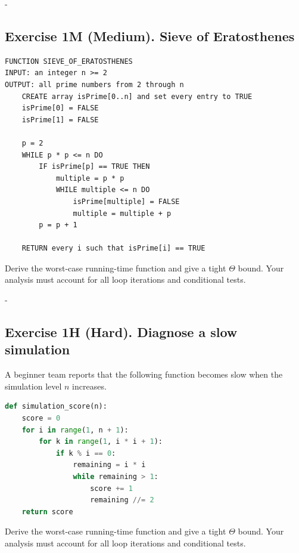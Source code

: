 \documentclass[11pt,a4paper]{article}
\makeatletter
\newcommand{\Needspace}[1]{\par\penalty-100\begingroup\setlength{\dimen@}{#1}\dimen@ii\pagegoal\advance\dimen@ii-\pagetotal\ifdim\dimen@>\dimen@ii\break\fi\endgroup}
\makeatother
\begin{document}
\Needspace{0.39\textheight}
\subsection*{Exercise 1M (Medium). Sieve of Eratosthenes}

\begin{problembox}
\begin{lstlisting}[style=pseudo]
FUNCTION SIEVE_OF_ERATOSTHENES
INPUT: an integer n >= 2
OUTPUT: all prime numbers from 2 through n
    CREATE array isPrime[0..n] and set every entry to TRUE
    isPrime[0] = FALSE
    isPrime[1] = FALSE

    p = 2
    WHILE p * p <= n DO
        IF isPrime[p] == TRUE THEN
            multiple = p * p
            WHILE multiple <= n DO
                isPrime[multiple] = FALSE
                multiple = multiple + p
        p = p + 1

    RETURN every i such that isPrime[i] == TRUE
\end{lstlisting}

Derive the worst-case running-time function and give a tight $\Theta$ bound.
Your analysis must account for all loop iterations and conditional tests.
\end{problembox}

\Needspace{0.43\textheight}
\subsection*{Exercise 1H (Hard). Diagnose a slow simulation}

\begin{problembox}
A beginner team reports that the following function becomes slow when the
simulation level $n$ increases.

\begin{lstlisting}[language=Python]
def simulation_score(n):
    score = 0
    for i in range(1, n + 1):
        for k in range(1, i * i + 1):
            if k % i == 0:
                remaining = i * i
                while remaining > 1:
                    score += 1
                    remaining //= 2
    return score
\end{lstlisting}

Derive the worst-case running-time function and give a tight $\Theta$ bound.
Your analysis must account for all loop iterations and conditional tests.
\end{problembox}

\end{document}
